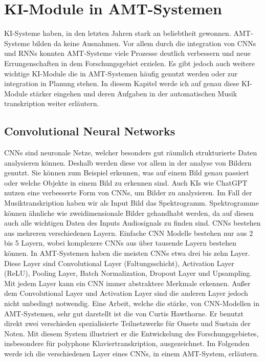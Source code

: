 \section{KI-Module in AMT-Systemen}
\label{sec:ki_integration}
KI-Systeme haben, in den letzten Jahren stark an beliebtheit gewonnen.
AMT-Systeme bilden da keine Ausnahmen.
Vor allem durch die integration von CNNs und RNNs konnten AMT-Systeme viele Prozesse deutlich verbessern
und neue Errungenschaften in dem Forschungsgebiet erzielen.
Es gibt jedoch auch weitere wichtige KI-Module die in AMT-Systemen häufig genutzt werden
oder zur integration in Planung stehen.
In diesem Kapitel werde ich auf genau diese KI-Module stärker eingehen
und deren Aufgaben in der automatischen Musik transkription weiter erläutern.

\subsection{Convolutional Neural Networks}
CNNs sind neuronale Netze, welcher besonders gut räumlich strukturierte Daten analysieren können.
Deshalb werden diese vor allem in der analyse von Bildern genutzt.
Sie können zum Beispiel erkennen, was auf einem Bild genau passiert oder welche Objekte in einem Bild zu erkennen sind.
Auch KIs wie ChatGPT nutzen eine verbesserte Form von CNNs, um Bilder zu analysieren.
Im Fall der Musiktranskription haben wir als Input Bild das Spektrogramm.
Spektrogramme können ähnliche wie zweidimensionale Bilder gehandhabt werden,
da auf diesen auch alle wichtigen Daten des Inputs Audiosignals zu finden sind.
CNNs bestehen aus mehreren verschiedenen Layern.
Einfache CNN Modelle bestehen nur aus 2 bis 5 Layern,
wobei komplexere CNNs aus über tausende Layern bestehen können.
In AMT-Systemen haben die meisten CNNs etwa drei bis zehn Layer.
Diese Layer sind Convolutional Layer (Faltungsschicht), Activation Layer (ReLU), Pooling Layer,
Batch Normalization, Dropout Layer und Upsampling.
Mit jedem Layer kann ein CNN immer abstraktere Merkmale erkennen.
Außer dem Convolutional Layer und Activation Layer sind die anderen Layer jedoch nicht unbedingt notwendig.
Eine Arbeit, welche die stärke, von CNN-Modellen in AMT-Systemen, sehr gut darstellt ist die von Curtis Hawthorne.
\cite{hawthorne2017onsets}
Er benutzt direkt zwei verschieden spezialisierte Teilnetzwerke für Onsets und Sustain der Noten.
Mit diesem System illustriert er die Entwickelung des Forschungsgebietes,
insbesondere für polyphone Klaviertranskription, ausgezeichnet.
Im Folgenden werde ich die verschiedenen Layer eines CNNs, in einem AMT-System, erläutern.

